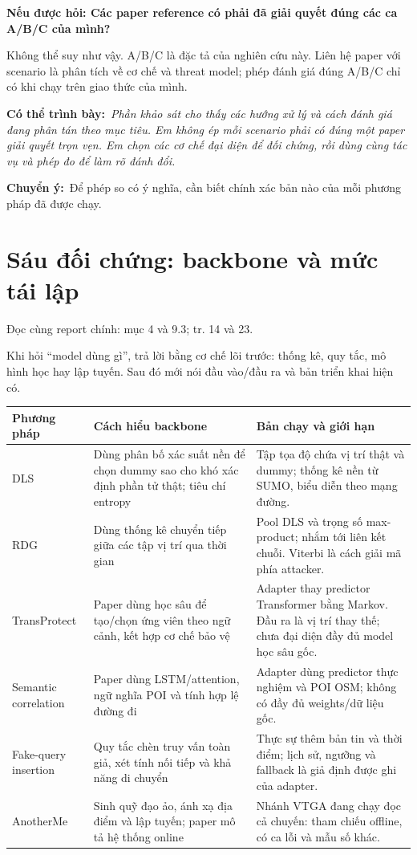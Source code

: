 \documentclass[10pt,a4paper]{article}
\newcommand{\say}[1]{\par\textbf{Có thể trình bày:}\ \textit{#1}\par}
\newcommand{\ask}[2]{\par\textbf{Nếu được hỏi: #1}\par #2\par}
\newcommand{\where}[1]{\par{\small\color{gray}Đọc cùng report chính: #1.}\par}
\newcommand{\transition}[1]{\par\textbf{Chuyển ý:}\ #1\par}
\newcommand{\guidepage}[1]{\clearpage\section{#1}}
\begin{document}
\ask{Các paper reference có phải đã giải quyết đúng các ca A/B/C của mình?}{Không thể suy như vậy. A/B/C là đặc tả của nghiên cứu này. Liên hệ paper với scenario là phân tích về cơ chế và threat model; phép đánh giá đúng A/B/C chỉ có khi chạy trên giao thức của mình.}

\say{Phần khảo sát cho thấy các hướng xử lý và cách đánh giá đang phân tán theo mục tiêu. Em không ép mỗi scenario phải có đúng một paper giải quyết trọn vẹn. Em chọn các cơ chế đại diện để đối chứng, rồi dùng cùng tác vụ và phép đo để làm rõ đánh đổi.}
\transition{Để phép so có ý nghĩa, cần biết chính xác bản nào của mỗi phương pháp đã được chạy.}

\guidepage{Sáu đối chứng: backbone và mức tái lập}
\where{mục 4 và 9.3; tr. 14 và 23}
Khi hỏi ``model dùng gì'', trả lời bằng cơ chế lõi trước: thống kê, quy tắc, mô hình học hay lập tuyến. Sau đó mới nói đầu vào/đầu ra và bản triển khai hiện có.

\begin{longtable}{@{}P{2.7cm}P{6.4cm}P{7.1cm}@{}}
\toprule Phương pháp & Cách hiểu backbone & Bản chạy và giới hạn\\\midrule
DLS & Dùng phân bố xác suất nền để chọn dummy sao cho khó xác định phần tử thật; tiêu chí entropy & Tập tọa độ chứa vị trí thật và dummy; thống kê nền từ SUMO, biểu diễn theo mạng đường.\\[5pt]
RDG & Dùng thống kê chuyển tiếp giữa các tập vị trí qua thời gian & Pool DLS và trọng số max-product; nhắm tới liên kết chuỗi. Viterbi là cách giải mã phía attacker.\\[5pt]
TransProtect & Paper dùng học sâu để tạo/chọn ứng viên theo ngữ cảnh, kết hợp cơ chế bảo vệ & Adapter thay predictor Transformer bằng Markov. Đầu ra là vị trí thay thế; chưa đại diện đầy đủ model học sâu gốc.\\[5pt]
Semantic correlation & Paper dùng LSTM/attention, ngữ nghĩa POI và tính hợp lệ đường đi & Adapter dùng predictor thực nghiệm và POI OSM; không có đầy đủ weights/dữ liệu gốc.\\[5pt]
Fake-query insertion & Quy tắc chèn truy vấn toàn giả, xét tính nối tiếp và khả năng di chuyển & Thực sự thêm bản tin và thời điểm; lịch sử, ngưỡng và fallback là giả định được ghi của adapter.\\[5pt]
AnotherMe & Sinh quỹ đạo ảo, ánh xạ địa điểm và lập tuyến; paper mô tả hệ thống online & Nhánh VTGA đang chạy đọc cả chuyến: tham chiếu offline, có ca lỗi và mẫu số khác.\\
\bottomrule
\end{longtable}
\end{document}
